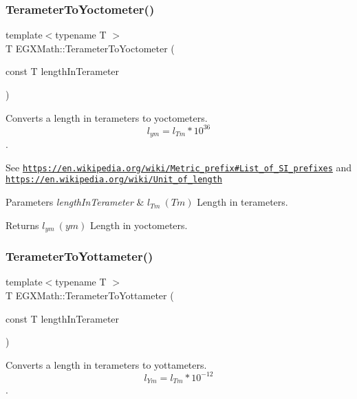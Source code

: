 \subsubsection{\texorpdfstring{Terameter\+To\+Yoctometer()}{TerameterToYoctometer()}}
{\footnotesize\ttfamily template$<$typename T $>$ \\
T E\+G\+X\+Math\+::\+Terameter\+To\+Yoctometer (\begin{DoxyParamCaption}\item[{const T}]{length\+In\+Terameter }\end{DoxyParamCaption})}



Converts a length in terameters to yoctometers. \[ l_{ym}=l_{Tm} * 10^{36} \]. 

See \href{https://en.wikipedia.org/wiki/Metric_prefix#List_of_SI_prefixes}{\tt https\+://en.\+wikipedia.\+org/wiki/\+Metric\+\_\+prefix\#\+List\+\_\+of\+\_\+\+S\+I\+\_\+prefixes} and \href{https://en.wikipedia.org/wiki/Unit_of_length}{\tt https\+://en.\+wikipedia.\+org/wiki/\+Unit\+\_\+of\+\_\+length} 
\begin{DoxyParams}{Parameters}
{\em length\+In\+Terameter} & $ l_{Tm}\ (Tm)$ Length in terameters. \\
\hline
\end{DoxyParams}
\begin{DoxyReturn}{Returns}
$ l_{ym}\ (ym)$ Length in yoctometers. 
\end{DoxyReturn}
\mbox{\label{group___e_g_x_math-_conversions-_length_conversions-_terameter-_s_i_gab0411fd993ebfe0b23de8d672203f68e}} 
\subsubsection{\texorpdfstring{Terameter\+To\+Yottameter()}{TerameterToYottameter()}}
{\footnotesize\ttfamily template$<$typename T $>$ \\
T E\+G\+X\+Math\+::\+Terameter\+To\+Yottameter (\begin{DoxyParamCaption}\item[{const T}]{length\+In\+Terameter }\end{DoxyParamCaption})}



Converts a length in terameters to yottameters. \[ l_{Ym}=l_{Tm} * 10^{-12} \]. 


